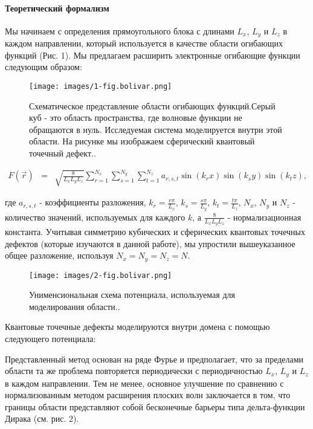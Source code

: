 \documentclass[a4paper,14pt]{extarticle}
\begin{document}
\paragraph{Теоретический формализм}

Мы начинаем с определения прямоугольного блока с длинами \( L_x \), \( L_y \) и \( L_z \) в каждом направлении, который используется в качестве области огибающих функций (Рис. 1). Мы предлагаем расширить электронные огибающие функции следующим образом:

\begin{figure}[htbp]
    \centering
    \texttt{[image: images/1-fig.bolivar.png]}
    \caption{\label{fig:bolivar1} Схематическое представление области огибающих функций.Серый куб - это область пространства, где волновые функции не обращаются в нуль. Исследуемая система моделируется внутри этой области. На рисунке мы изображаем сферический квантовый точечный дефект.\cite{bolivar}.}
\end{figure}

\begin{eqnarray}
    F(\vec{r}) &=& \sqrt{\frac{8}{L_x L_y L_z} }\sum_{r=1}^{N_x} \sum_{s=1}^{N_y} \sum_{t=1}^{N_z} a_{r,s,t} \sin(k_rx) \sin(k_sy) \sin(k_tz),
    \end{eqnarray}

где \( a_{r,s,t} \) - коэффициенты разложения, \( k_r = \frac{r\pi}{L_x} \), \( k_s = \frac{s\pi}{L_y} \), \( k_t = \frac{t\pi}{L_z} \), \( N_x \), \( N_y \) и \( N_z \) - количество значений, используемых для каждого \( k \), а \( \frac{8}{L_x L_y L_z} \) - нормализационная константа. Учитывая симметрию кубических и сферических квантовых точечных дефектов (которые изучаются в данной работе), мы упростили вышеуказанное общее разложение, используя \( N_x = N_y = N_z = N \).

\begin{figure}[htbp]
    \centering
    \texttt{[image: images/2-fig.bolivar.png]}
    \caption{\label{fig:bolivar2} Унименсиональная схема потенциала, используемая для моделирования области.\cite{bolivar}.}
\end{figure}

Квантовые точечные дефекты моделируются внутри домена с помощью следующего потенциала:

Представленный метод основан на ряде Фурье и предполагает, что за пределами области та же проблема повторяется периодически с периодичностью $L_x$, $L_y$ и $L_z$ в каждом направлении. Тем не менее, основное улучшение по сравнению с нормализованным методом расширения плоских волн заключается в том, что границы области представляют собой бесконечные барьеры типа дельта-функции Дирака (см. рис. 2).
\end{document}
